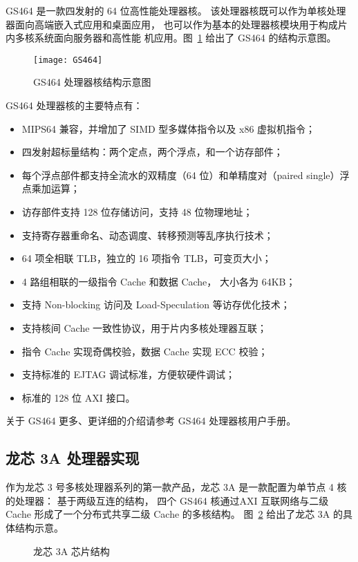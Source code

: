 GS464 是一款四发射的 64 位高性能处理器核。
该处理器核既可以作为单核处理器面向高端嵌入式应用和桌面应用，
也可以作为基本的处理器核模块用于构成片内多核系统面向服务器和高性能
机应用。图~\ref{fig:gs464-arch} 给出了 GS464 的结构示意图。
\begin{figure}[htbp]
  \centering
  \texttt{[image: GS464]}
  \caption{GS464 处理器核结构示意图}
  \label{fig:gs464-arch}
\end{figure}
GS464 处理器核的主要特点有：
\begin{itemize}
 \item MIPS64 兼容，并增加了 SIMD 型多媒体指令以及 x86 虚拟机指令；
 \item 四发射超标量结构：两个定点，两个浮点，和一个访存部件；
 \item 每个浮点部件都支持全流水的双精度（64 位）和单精度对（paired
   single）浮点乘加运算；
 \item 访存部件支持 128 位存储访问，支持 48 位物理地址；
 \item 支持寄存器重命名、动态调度、转移预测等乱序执行技术；
 \item 64 项全相联 TLB，独立的 16 项指令 TLB，可变页大小；
 \item 4 路组相联的一级指令 Cache 和数据 Cache， 大小各为 64KB；
 \item 支持 Non-blocking 访问及 Load-Speculation 等访存优化技术；
 \item 支持核间 Cache 一致性协议，用于片内多核处理器互联；
 \item 指令 Cache 实现奇偶校验，数据 Cache 实现 ECC 校验；
 \item 支持标准的 EJTAG 调试标准，方便软硬件调试；
 \item 标准的 128 位 AXI 接口。
\end{itemize}
关于 GS464 更多、更详细的介绍请参考 GS464 处理器核用户手册。

\subsection{龙芯 3A 处理器实现}

作为龙芯 3 号多核处理器系列的第一款产品，龙芯 3A 是一款配置为单节点 4
核的处理器： 基于两级互连的结构， 四个 GS464 核通过AXI 互联网络与二级 Cache
形成了一个分布式共享二级 Cache 的多核结构。 图~\ref{fig:ls3a-structure}
给出了龙芯 3A 的具体结构示意。

\begin{figure}[htbp]
  \centering
  \setlength\fboxsep{15pt}
  \setlength\fboxrule{.5pt}
  \caption{龙芯 3A 芯片结构}
  \label{fig:ls3a-structure}
\end{figure}

